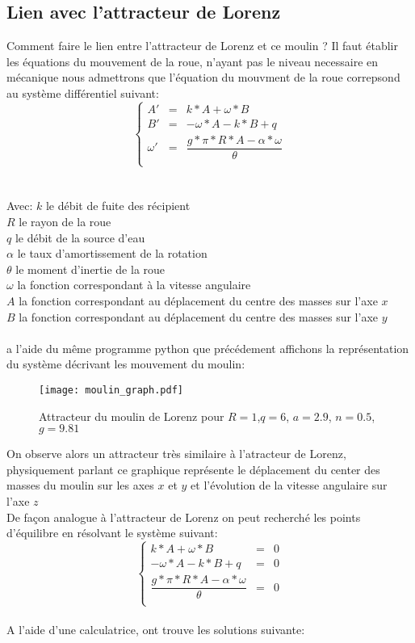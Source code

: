 \subsection{Lien avec l'attracteur de Lorenz}
Comment faire le lien entre l'attracteur de Lorenz et ce moulin ? Il faut établir les équations du mouvement de la roue, n'ayant pas le niveau necessaire en mécanique nous admettrons que l'équation du mouvment de la roue correpsond au système différentiel suivant:\\
\[
    \left\{
    \begin{array}{rcl}
        A'&=&k*A+\omega*B\\
        B'&=&-\omega*A-k*B+q\\
        \omega'&=&\dfrac{g*\pi*R*A-\alpha*\omega}{\theta }\\
    \end{array}
    \right.
\]\\\\
Avec: $k$ le débit de fuite des récipient\\
$R$ le rayon de la roue\\
$q$ le débit de la source d'eau\\
$\alpha$ le taux d'amortissement de la rotation\\
$\theta$ le moment d'inertie de la roue\\
$\omega$ la fonction correspondant à la vitesse angulaire\\
$A$ la fonction correspondant au déplacement du centre des masses sur l'axe $x$\\
$B$ la fonction correspondant au déplacement du centre des masses sur l'axe $y$\\\\

a l'aide du même programme python que précédement affichons la représentation du système décrivant les mouvement du moulin:

\begin{figure}
    \texttt{[image: moulin\_graph.pdf]}
    \caption{Attracteur du moulin de Lorenz pour $R=1$,$q=6$, $a=2.9$, $n=0.5$, $g=9.81$ } 
\end{figure}

On observe alors un attracteur très similaire à l'atracteur de Lorenz, physiquement parlant ce graphique représente le déplacement du center des masses du moulin sur les axes $x$ et $y$ et l'évolution de la vitesse angulaire sur l'axe $z$\\

De façon analogue à l'attracteur de Lorenz on peut recherché les points d'équilibre en résolvant le système suivant:\\
\[
    \left\{
    \begin{array}{rcl}
        k*A+\omega*B&=&0\\
        -\omega*A-k*B+q&=&0\\
        \dfrac{g*\pi*R*A-\alpha*\omega}{\theta }&=&0\\
    \end{array}
    \right.
\]\\

A l'aide d'une calculatrice, ont trouve les solutions suivante: